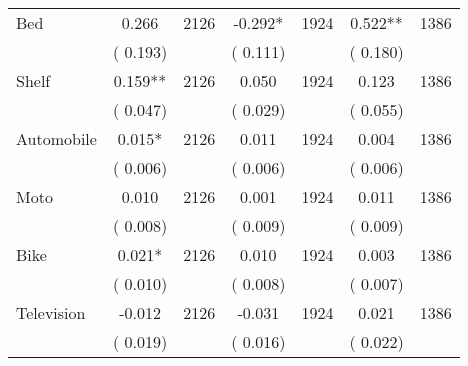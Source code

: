 \begin{tabular}{l*{6}{c}}
Bed        &              0.266      &       2126       &             -0.292*      &       1924       &              0.522**      &       1386       \\
                       &       (       0.193)            &                               &       (       0.111)            &                               &       (       0.180)            &                               \\
Shelf        &              0.159**      &       2126       &              0.050      &       1924       &              0.123      &       1386       \\
                       &       (       0.047)            &                               &       (       0.029)            &                               &       (       0.055)            &                               \\
Automobile        &              0.015*      &       2126       &              0.011      &       1924       &              0.004      &       1386       \\
                       &       (       0.006)            &                               &       (       0.006)            &                               &       (       0.006)            &                               \\
Moto        &              0.010      &       2126       &              0.001      &       1924       &              0.011      &       1386       \\
                       &       (       0.008)            &                               &       (       0.009)            &                               &       (       0.009)            &                               \\
Bike        &              0.021*      &       2126       &              0.010      &       1924       &              0.003      &       1386       \\
                       &       (       0.010)            &                               &       (       0.008)            &                               &       (       0.007)            &                               \\
Television        &             -0.012      &       2126       &             -0.031      &       1924       &              0.021      &       1386       \\
                       &       (       0.019)            &                               &       (       0.016)            &                               &       (       0.022)            &                               \\

\end{tabular}
